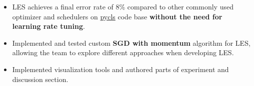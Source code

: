 \documentclass[10pt,a4paper,ragged2e,withhyper]{altacv}
\begin{document}
\begin{paracol}{2}
\begin{itemize}
    \item LES achieves a final error rate of 8\% compared to other commonly used optimizer and schedulers on \href{https://github.com/facebookresearch/pycls}{pycls} code base \textbf{without the need for learning rate tuning}. 
    
    \item Implemented and tested custom \textbf{SGD with momentum} algorithm for LES, allowing the team to explore different \@backpropagation approaches when developing LES\@.
    
    \item Implemented visualization tools and authored parts of experiment and discussion section.
    
\end{itemize}
    
    
    




    


\end{paracol}
\end{document}
